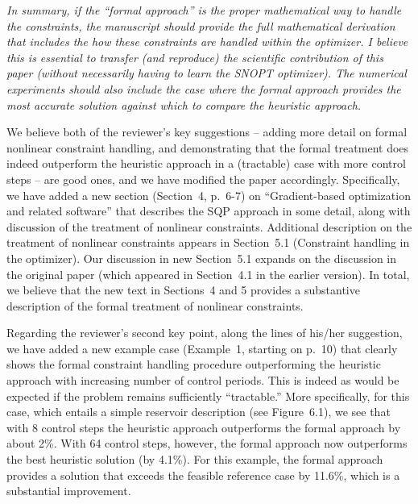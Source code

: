 \documentclass{article}
\begin{document}
{\it In summary, if the ``formal approach'' is the proper mathematical way to handle the constraints,
the manuscript should provide the full mathematical derivation that includes the how these constraints are handled within the optimizer. I believe this is essential to transfer (and reproduce) the scientific contribution of this paper (without necessarily having to learn the SNOPT optimizer). The numerical experiments should also include the case where the formal approach provides the most accurate solution against which to compare the heuristic approach.}

\vspace{10pt}

We believe both of the reviewer's key suggestions -- adding more detail on formal nonlinear constraint handling, and demonstrating that the formal treatment does indeed outperform the heuristic approach in a (tractable) case with more control steps -- are good ones, and we have modified the paper accordingly. Specifically, we have added a new section (Section~4, p.~6-7) on ``Gradient-based optimization and related software'' that describes the SQP approach in some detail, along with discussion of the treatment of nonlinear constraints. Additional description on the treatment of nonlinear constraints appears in Section~5.1 (Constraint handling in the optimizer). Our discussion in new Section~5.1 expands on the discussion in the original paper (which appeared in Section~4.1 in the earlier version). In total, we believe that the new text in Sections~4 and 5 provides a substantive description of the formal treatment of nonlinear constraints.

Regarding the reviewer's second key point, along the lines of his/her suggestion, we have added a new example case (Example~1, starting on p.~10) that clearly shows the formal constraint handling procedure outperforming the heuristic approach with increasing number of control periods. This is indeed as would be expected if the problem remains sufficiently ``tractable.'' More specifically, for this case, which entails a simple reservoir description (see Figure~6.1), we see that with 8 control steps the heuristic approach outperforms the formal approach by about 2\%. With 64 control steps, however, the formal approach now outperforms the best heuristic solution (by 4.1\%). For this example, the formal approach provides a solution that exceeds the feasible reference case by 11.6\%, which is a substantial improvement.
\end{document}
